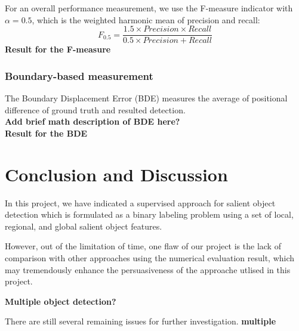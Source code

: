\documentclass[10pt,twocolumn,letterpaper]{article}
\newcommand{\BOLD}{\textbf}
\begin{document}
For an overall performance measurement, we use the F-measure indicator with $\alpha = 0.5$, which is the weighted 
harmonic mean of precision and recall:
$$
    F_{0.5} = \frac{1.5\times Precision \times Recall}{ 0.5 \times Precision + Recall}
$$
\BOLD{Result for the F-measure}
\subsubsection{Boundary-based measurement}
The Boundary Displacement Error (BDE) measures the average of positional difference 
of ground truth and resulted detection. \\
\BOLD{Add brief math description of BDE here?} \\
\BOLD{Result for the BDE}

\section{Conclusion and Discussion}
In this project, we have indicated a supervised approach for salient object detection 
which is formulated as a binary labeling problem using a set of local, regional,
and global salient object features.

However, out of the limitation of time, one flaw of our project is the lack of comparison
with other approaches using the numerical evaluation result, which may tremendously 
enhance the persuasiveness of the approache utlised in this project. 

\BOLD{Multiple object detection?}

There are still several remaining issues for further investigation. 
\BOLD{multiple }
\end{document}

